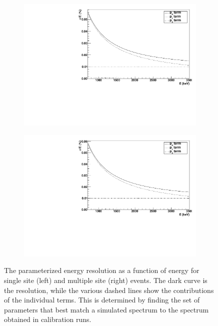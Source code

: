 \documentclass[herrin-thesis.tex]{subfiles}
\begin{document}
\begin{figure}[htp]
\centering
	\begin{subfigure}[b]{0.48\textwidth}
	\centering
	\includegraphics[width=\textwidth]{./plots/analysis_resolution_ss.pdf}
	\end{subfigure}\hfill%
	\begin{subfigure}[b]{0.48\textwidth}
	\centering
	\includegraphics[width=\textwidth]{./plots/analysis_resolution_ms.pdf}
	\end{subfigure}
\caption[Parameterized energy resolution functions]{The parameterized energy resolution as a function of energy for single site (left) and multiple site (right) events. The dark curve is the resolution, while the various dashed lines show the contributions of the individual terms. This is determined by finding the set of parameters that best match a simulated spectrum to the spectrum obtained in calibration runs.}
\label{fig:analysis_resolution}
\end{figure}
\end{document}
